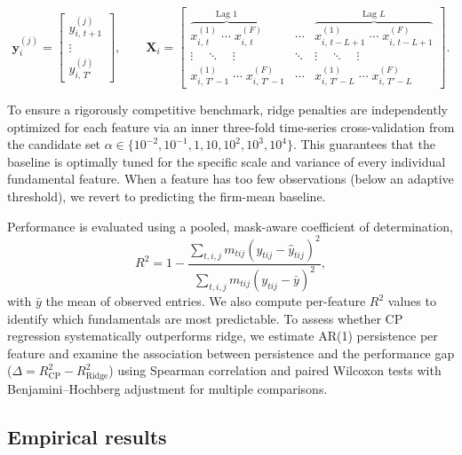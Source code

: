 \documentclass[pdflatex,sn-mathphys-num]{sn-jnl}%
\theoremstyle{thmstyleone}%
\theoremstyle{thmstyletwo}%
\theoremstyle{thmstylethree}%
\begin{document}
\begin{equation} \label{eq:ridge_firm_elements}
\mathbf{y}_i^{(j)} =
\begin{bmatrix}
y_{i,\, t+1}^{(j)} \\
\vdots \\
y_{i,\, T'}^{(j)}
\end{bmatrix},
\qquad
\mathbf{X}_i =
\begin{bmatrix}
\overbrace{x_{i,\, t}^{(1)} \;\cdots\; x_{i,\, t}^{(F)}}^{\text{Lag } 1} & \cdots &
\overbrace{x_{i,\, t-L+1}^{(1)} \;\cdots\; x_{i,\, t-L+1}^{(F)}}^{\text{Lag } L} \\[4pt]
\vdots \quad \ddots \quad \vdots & \ddots & \vdots \quad \ddots \quad \vdots \\[4pt]
x_{i,\, T'\!-1}^{(1)} \;\cdots\; x_{i,\, T'\!-1}^{(F)} & \cdots &
x_{i,\, T'\!-L}^{(1)} \;\cdots\; x_{i,\, T'\!-L}^{(F)}
\end{bmatrix}.
\end{equation}

To ensure a rigorously competitive benchmark, ridge penalties are independently optimized for each feature via an inner three-fold time-series cross-validation from the candidate set $\alpha \in \{10^{-2}, 10^{-1}, 1, 10, 10^2, 10^3, 10^4\}$. This guarantees that the baseline is optimally tuned for the specific scale and variance of every individual fundamental feature. When a feature has too few observations (below an adaptive threshold), we revert to predicting the firm-mean baseline.

Performance is evaluated using a pooled, mask-aware coefficient of determination,
\begin{equation}
R^2 = 1 - \frac{\sum_{t,i,j} m_{tij} (y_{tij} - \widehat{y}_{tij})^2}
{\sum_{t,i,j} m_{tij} (y_{tij} - \bar{y})^2},
\end{equation}
with $\bar{y}$ the mean of observed entries. We also compute per-feature $R^2$ values to identify which fundamentals are most predictable. To assess whether CP regression systematically outperforms ridge, we estimate AR(1) persistence per feature and examine the association between persistence and the performance gap ($\Delta = R^2_{\mathrm{CP}} - R^2_{\mathrm{Ridge}}$) using Spearman correlation and paired Wilcoxon tests with Benjamini--Hochberg adjustment for multiple comparisons.

\subsection{Empirical results}
\label{Section:Predictive_Results}
\end{document}
